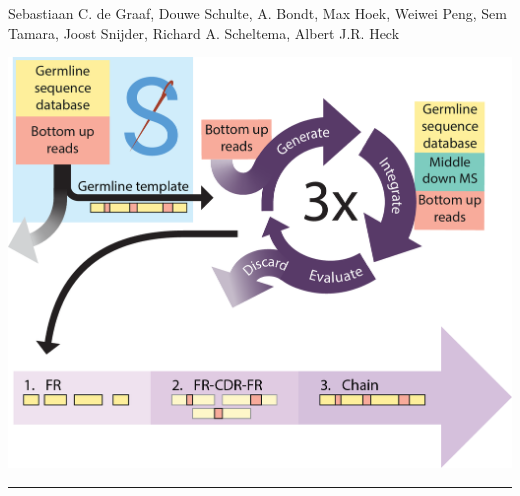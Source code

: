  \label{ch-5}
\vspace*{0.25cm}

{\footnotesize Sebastiaan C. de Graaf, Douwe Schulte, A. Bondt, Max Hoek, Weiwei Peng, Sem Tamara, Joost Snijder, Richard A. Scheltema, Albert J.R. Heck}
\begin{center}
  \vspace{3cm}
  \includegraphics[]{Chapter.5/Figures/Ch5.png}
  \vspace{0.25cm}
\end{center}

\begin{flushleft}
  \vspace*{\fill}
  \rule{\textwidth}{1pt}\\[0cm]
\end{flushleft}

